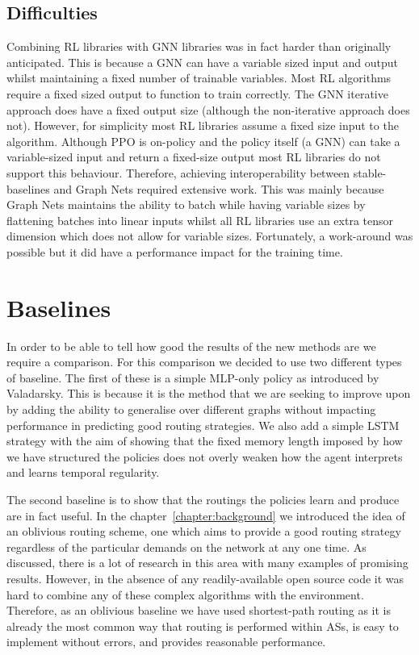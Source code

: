 \subsection{Difficulties}
Combining RL libraries with GNN libraries was in fact harder than originally anticipated. This is because a GNN can have a variable sized input and output whilst maintaining a fixed number of trainable variables. Most RL algorithms require a fixed sized output to function to train correctly. The GNN iterative approach does have a fixed output size (although the non-iterative approach does not). However, for simplicity most RL libraries assume a fixed size input to the algorithm. Although PPO is on-policy and the policy itself (a GNN) can take a variable-sized input and return a fixed-size output most RL libraries do not support this behaviour. Therefore, achieving interoperability between stable-baselines and Graph Nets required extensive work. This was mainly because Graph Nets maintains the ability to batch while having variable sizes by flattening batches into linear inputs whilst all RL libraries use an extra tensor dimension which does not allow for variable sizes. Fortunately, a work-around was possible but it did have a performance impact for the training time.


\section{Baselines}
In order to be able to tell how good the results of the new methods are we require a comparison. For this comparison we decided to use two different types of baseline. The first of these is a simple MLP-only policy as introduced by Valadarsky. This is because it is the method that we are seeking to improve upon by adding the ability to generalise over different graphs without impacting performance in predicting good routing strategies. We also add a simple LSTM strategy with the aim of showing that the fixed memory length imposed by how we have structured the policies does not overly weaken how the agent interprets and learns temporal regularity.

The second baseline is to show that the routings the policies learn and produce are in fact useful. In the chapter~\ref{chapter:background} we introduced the idea of an oblivious routing scheme, one which aims to provide a good routing strategy regardless of the particular demands on the network at any one time. As discussed, there is a lot of research in this area with many examples of promising results. However, in the absence of any readily-available open source code it was hard to combine any of these complex algorithms with the environment. Therefore, as an oblivious baseline we have used shortest-path routing as it is already the most common way that routing is performed within ASs, is easy to implement without errors, and provides reasonable performance.

